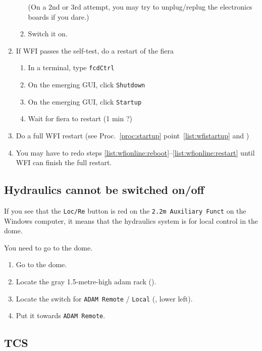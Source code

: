 \documentclass[11pt,fleqn,a4paper]{book}
\begin{document}
\begin{enumerate}
\begin{enumerate}
                      (On a 2nd or 3rd attempt, you may try to unplug/replug the electronics boards if you dare.)
		\item Switch it on.
	\end{enumerate}
  \item  If WFI passes the self-test, do a restart of the \gls{fiera} 
        \begin{enumerate}
		\item In a terminal, type \texttt{fcdCtrl}
                \item On the emerging GUI, click \texttt{Shutdown}
                \item On the emerging GUI, click \texttt{Startup}
		\item Wait for \gls{fiera} to restart (1 min ?)
        \end{enumerate}
  \item\label{list:wfionline:restart} Do a full WFI restart (see Proc.~\ref{proc:startup} point~\ref{list:wfistartup} and )
  \item You may have to redo steps \ref{list:wfionline:reboot}--\ref{list:wfionline:restart} until WFI can finish the full restart.
\end{enumerate}


\subsection{Hydraulics cannot be switched on/off}
\label{sec:hydr-loc}
If you see that the \texttt{Loc/Re} button is red on the \texttt{2.2m Auxiliary Funct} on the Windows computer, it means that the hydraulics system is for local control in the dome.

You need to go to the dome.

\begin{enumerate}
   \item Go to the dome.
   \item Locate the gray 1.5-metre-high \gls{adam} rack ().
   \item Locate the switch for \texttt{ADAM Remote} / \texttt{Local} (, lower left).
   \item Put it towards \texttt{ADAM Remote}.
\end{enumerate}

\subsection{TCS}
\end{document}
